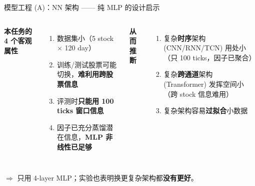 \documentclass[aspectratio=169,11pt]{beamer}
\newcommand{\hl}[1]{\textcolor{lblue}{\textbf{#1}}}
\newcommand{\rhl}[1]{\textcolor{accred}{\textbf{#1}}}
\begin{document}
\begin{frame}{模型工程 (A)：NN 架构 —— 纯 MLP 的设计启示}
  \vspace{-4pt}
  \begin{columns}[T,onlytextwidth]
    \scriptsize
    \textbf{\color{icmlblue}本任务的 4 个客观属性}
    \begin{enumerate}\setlength{\itemsep}{1pt}
      \item 数据集小（5 stock $\times$ 120 day）
      \item 训练/测试股票可能切换，\textbf{难利用跨股票信息}
      \item 评测时\textbf{只能用 100 ticks 窗口信息}
      \item 因子已充分蒸馏潜在信息，\textbf{MLP 非线性已足够}
    \end{enumerate}

    \scriptsize
    \textbf{\color{icmlblue}从而推断}
    \begin{enumerate}\setlength{\itemsep}{1pt}
      \item 复杂\hl{时序}架构 (CNN/RNN/TCN) 用处小（只 100 ticks，因子已聚合）
      \item 复杂\hl{跨通道}架构 (Transformer) 发挥空间小（跨 stock 信息难用）
      \item 复杂架构容易\rhl{过拟合}小数据
    \end{enumerate}
  \end{columns}
  \vspace{-2pt}
  \begin{center}\footnotesize
    $\Rightarrow$ 只用 4-layer MLP；实验也表明换更复杂架构都\textbf{没有更好}。
  \end{center}


\end{frame}
\end{document}
